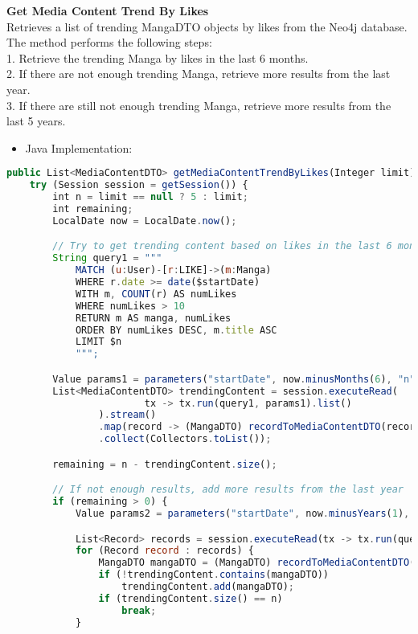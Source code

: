 \textbf{Get Media Content Trend By Likes}\\
Retrieves a list of trending MangaDTO objects by likes from the Neo4j database.
The method performs the following steps:\\
1. Retrieve the trending Manga by likes in the last 6 months.\\
2. If there are not enough trending Manga, retrieve more results from the last year.\\
3. If there are still not enough trending Manga, retrieve more results from the last 5 years.\\
\begin{itemize}
    \item Java Implementation:
\end{itemize}
\begin{lstlisting}[language=JavaScript]
public List<MediaContentDTO> getMediaContentTrendByLikes(Integer limit) throws DAOException {
    try (Session session = getSession()) {
        int n = limit == null ? 5 : limit;
        int remaining;
        LocalDate now = LocalDate.now();

        // Try to get trending content based on likes in the last 6 months
        String query1 = """
            MATCH (u:User)-[r:LIKE]->(m:Manga)
            WHERE r.date >= date($startDate)
            WITH m, COUNT(r) AS numLikes
            WHERE numLikes > 10
            RETURN m AS manga, numLikes
            ORDER BY numLikes DESC, m.title ASC
            LIMIT $n
            """;

        Value params1 = parameters("startDate", now.minusMonths(6), "n", n);
        List<MediaContentDTO> trendingContent = session.executeRead(
                        tx -> tx.run(query1, params1).list()
                ).stream()
                .map(record -> (MangaDTO) recordToMediaContentDTO(record))
                .collect(Collectors.toList());

        remaining = n - trendingContent.size();

        // If not enough results, add more results from the last year
        if (remaining > 0) {
            Value params2 = parameters("startDate", now.minusYears(1), "n", remaining);

            List<Record> records = session.executeRead(tx -> tx.run(query1, params2).list());
            for (Record record : records) {
                MangaDTO mangaDTO = (MangaDTO) recordToMediaContentDTO(record);
                if (!trendingContent.contains(mangaDTO))
                    trendingContent.add(mangaDTO);
                if (trendingContent.size() == n)
                    break;
            }


\end{lstlisting}
